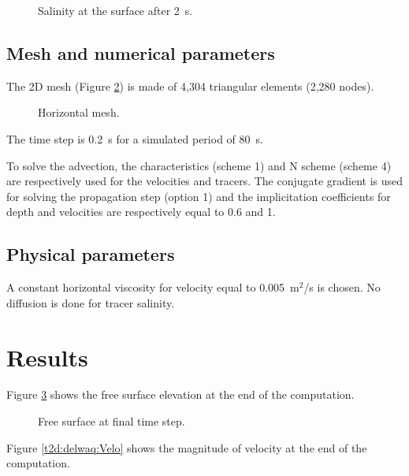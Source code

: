 \begin{figure}[H]
  \centering
  \caption{Salinity at the surface after 2~s.}
  \label{t2d:delwaq:Salinityt1}
\end{figure}

\subsection{Mesh and numerical parameters}

The 2D mesh (Figure \ref{t2d:delwaq:fig:mesh})
is made of 4,304 triangular elements (2,280 nodes).

\begin{figure}[!htbp]
 \centering
 \caption{Horizontal mesh.}
 \label{t2d:delwaq:fig:mesh}
\end{figure}

The time step is 0.2~s for a simulated period of 80~s.

To solve the advection, the characteristics (scheme 1) and N scheme (scheme 4)
are respectively used for the velocities and tracers.
The conjugate gradient
is used for solving the propagation step (option 1) and
the implicitation coefficients
for depth and velocities are respectively equal to 0.6 and 1.

\subsection{Physical parameters}

A constant horizontal viscosity for velocity equal to 0.005~m$^2$/s is chosen.
No diffusion is done for tracer salinity.

\section{Results}

Figure \ref{t2d:delwaq:FreeSurf} shows the free surface elevation at the end of
the computation.

\begin{figure}[H]
  \centering
  \caption{Free surface at final time step.}
  \label{t2d:delwaq:FreeSurf}
\end{figure}

Figure \ref{t2d:delwaq:Velo} shows the magnitude of velocity at the end of the
computation.

